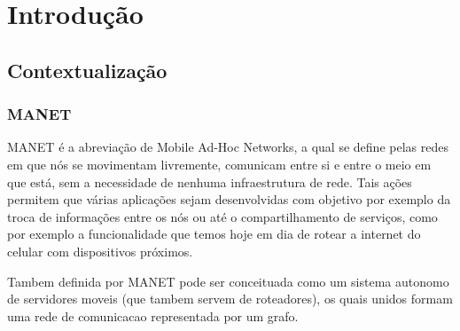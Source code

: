 \documentclass[12pt, %
openright, 
oneside,
a4paper,
brazil]{facom-ufu-abntex2}
\begin{document}

\tableofcontents*
\cleardoublepage





\textual



\chapter{Introdução}
\section{Contextualização}
\subsection{MANET}
MANET é a abreviação de Mobile Ad-Hoc Networks, a qual se define pelas redes em que nós se movimentam livremente, comunicam entre si e entre o meio em que está, sem a necessidade de nenhuma infraestrutura de rede. Tais ações permitem que várias aplicações sejam desenvolvidas com objetivo por exemplo da troca de informações entre os nós ou até o compartilhamento de serviços, como por exemplo a funcionalidade que temos hoje em dia de rotear a internet do celular com dispositivos próximos.


Tambem definida por MANET pode ser conceituada como um sistema autonomo de servidores moveis (que tambem servem de roteadores), os quais unidos formam uma rede de comunicacao representada por um grafo.
\end{document}
